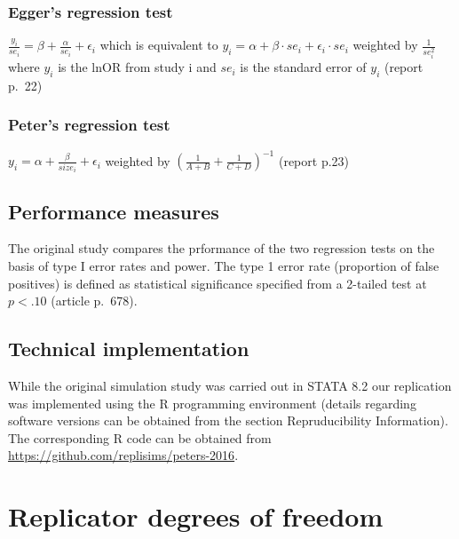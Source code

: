 \documentclass[
  english,
  doc,floatsintext,draftall]{apa6}
\begin{document}
\hypertarget{eggers-regression-test}{%
\subsubsection{Egger's regression test}\label{eggers-regression-test}}

\(\frac{y_i}{se_i}= \beta + \frac{\alpha}{se_i}+\epsilon_i\) which is equivalent to
\(y_i = \alpha +\beta \cdot se_i +\epsilon_i \cdot se_i\) weighted by \(\frac{1}{se_i^2}\)
where \(y_i\) is the lnOR from study i and \(se_i\) is the standard error of \(y_i\)
(report p.~22)

\hypertarget{peters-regression-test}{%
\subsubsection{Peter's regression test}\label{peters-regression-test}}

\(y_i = \alpha +\frac{\beta}{size_i} + \epsilon_i\) weighted by \((\frac{1}{A+B}+\frac{1}{C+D})^{-1}\)
(report p.23)

\hypertarget{performance-measures}{%
\subsection{Performance measures}\label{performance-measures}}

The original study compares the prformance of the two regression tests on the basis of type I error rates and power.
The type 1 error rate (proportion of false positives) is defined as statistical significance specified from a 2-tailed test at \(p<.10\) (article p.~678).

\hypertarget{technical-implementation}{%
\subsection{Technical implementation}\label{technical-implementation}}

While the original simulation study was carried out in STATA 8.2 our replication was implemented
using the R programming environment (details regarding software versions can be obtained from the section Repruducibility Information).
The corresponding R code can be obtained from \url{https://github.com/replisims/peters-2016}.

\hypertarget{replicator-degrees-of-freedom}{%
\section{Replicator degrees of freedom}\label{replicator-degrees-of-freedom}}
\end{document}
